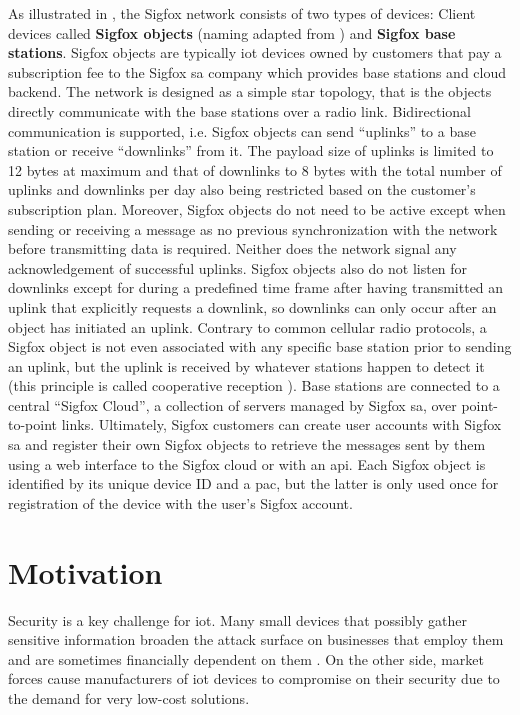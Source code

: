 As illustrated in , the Sigfox network consists of two types of devices: Client devices called \textbf{Sigfox objects} (naming adapted from \cite{sigfox_tech}) and \textbf{Sigfox base stations}.
Sigfox objects are typically \gls{iot} devices owned by customers that pay a subscription fee to the Sigfox \gls{sa} company which provides base stations and cloud backend.
The network is designed as a simple star topology, that is the objects directly communicate with the base stations over a radio link.
Bidirectional communication is supported, i.e. Sigfox objects can send ``uplinks'' to a base station or receive ``downlinks'' from it.
The payload size of uplinks is limited to 12 bytes at maximum and that of downlinks to 8 bytes with the total number of uplinks and downlinks per day also being restricted based on the customer's subscription plan.
Moreover, Sigfox objects do not need to be active except when sending or receiving a message as no previous synchronization with the network before transmitting data is required.
Neither does the network signal any acknowledgement of successful uplinks.
Sigfox objects also do not listen for downlinks except for during a predefined time frame after having transmitted an uplink that explicitly requests a downlink, so downlinks can only occur after an object has initiated an uplink.
Contrary to common cellular radio protocols, a Sigfox object is not even associated with any specific base station prior to sending an uplink, but the uplink is received by whatever stations happen to detect it (this principle is called cooperative reception \cite[Section 3.3]{sigfox_tech}).
Base stations are connected to a central ``Sigfox Cloud'', a collection of servers managed by Sigfox \gls{sa}, over point-to-point links.
Ultimately, Sigfox customers can create user accounts with Sigfox \gls{sa} and register their own Sigfox objects to retrieve the messages sent by them using a web interface to the Sigfox cloud or with an \gls{api}.
Each Sigfox object is identified by its unique device ID and a \gls{pac}, but the latter is only used once for registration of the device with the user's Sigfox account.

\FloatBarrier
\section{Motivation}
Security is a key challenge for \gls{iot}.
Many small devices that possibly gather sensitive information broaden the attack surface on businesses that employ them and are sometimes financially dependent on them \cite[Executive Summary]{sigfox_security_whitepaper}.
On the other side, market forces cause manufacturers of \gls{iot} devices to compromise on their security due to the demand for very low-cost solutions.

